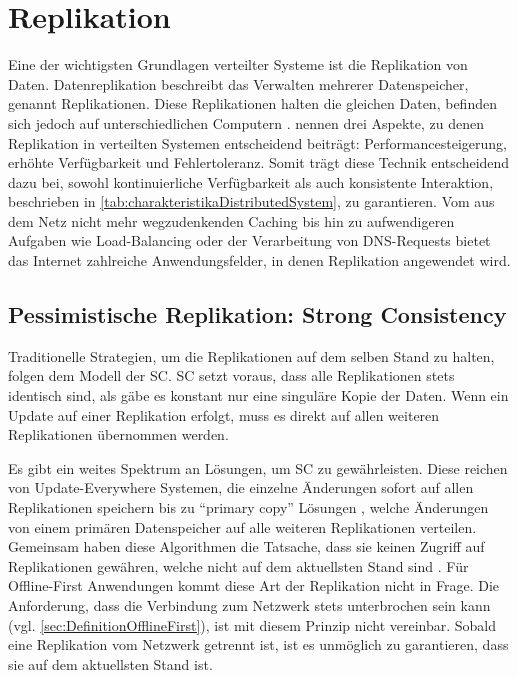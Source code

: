 \documentclass[a4paper, 12pt]{scrreprt}
\begin{document}
\section{Replikation}

Eine der wichtigsten Grundlagen verteilter Systeme ist die Replikation von Daten. Datenreplikation beschreibt das Verwalten mehrerer Datenspeicher, genannt Replikationen. Diese Replikationen halten die gleichen Daten, befinden sich jedoch auf unterschiedlichen Computern \autocite[S. 42]{ArticleOptimisticReplication}. \citet{BookDistributedSystemsConceptsAndDesign} nennen drei Aspekte, zu denen Replikation in verteilten Systemen entscheidend beiträgt: Performancesteigerung, erhöhte Verfügbarkeit und Fehlertoleranz. Somit trägt diese Technik entscheidend dazu bei, sowohl kontinuierliche Verfügbarkeit als auch konsistente Interaktion, beschrieben in \ref{tab:charakteristikaDistributedSystem}, zu garantieren. Vom aus dem Netz nicht mehr wegzudenkenden Caching bis hin zu aufwendigeren Aufgaben wie Load-Balancing oder der Verarbeitung von DNS-Requests bietet das Internet zahlreiche Anwendungsfelder, in denen Replikation angewendet wird. 

\subsection{Pessimistische Replikation: Strong Consistency}

Traditionelle Strategien, um die Replikationen auf dem selben Stand zu halten, folgen dem Modell der \ac{SC}. \ac{SC} setzt voraus, dass alle Replikationen stets identisch sind, als gäbe es konstant nur eine singuläre Kopie der Daten. Wenn ein Update auf einer Replikation erfolgt, muss es direkt auf allen weiteren Replikationen übernommen werden. 

Es gibt ein weites Spektrum an Lösungen, um \ac{SC} zu gewährleisten. Diese reichen von {Update-Everywhere} Systemen, die einzelne Änderungen sofort auf allen Replikationen speichern \autocite{ThesisUpdateEverywhere} bis zu \enquote{primary copy} Lösungen \autocite[S. 14]{BookPrimaryReplica}, welche Änderungen von einem primären Datenspeicher auf alle weiteren Replikationen verteilen. Gemeinsam haben diese Algorithmen die Tatsache, dass sie keinen Zugriff auf Replikationen gewähren, welche nicht auf dem aktuellsten Stand sind \autocite[S. 43]{ArticleOptimisticReplication}. Für Offline-First Anwendungen kommt diese Art der Replikation nicht in Frage. Die Anforderung, dass die Verbindung zum Netzwerk stets unterbrochen sein kann (vgl. \ref{sec:DefinitionOfflineFirst}), ist mit diesem Prinzip nicht vereinbar. Sobald eine Replikation vom Netzwerk getrennt ist, ist es unmöglich zu garantieren, dass sie auf dem aktuellsten Stand ist.
\end{document}
